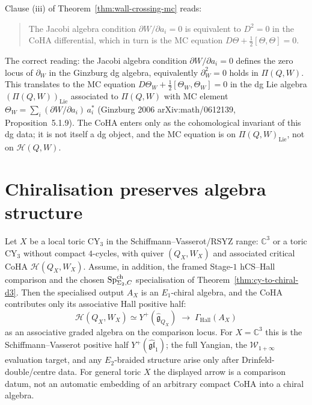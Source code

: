 \begin{remark}
\label{rem:reconciliation-wall-crossing-prose}
Clause (iii) of Theorem~\ref{thm:wall-crossing-mc} reads:
\begin{quote}
 The Jacobi algebra condition $\partial W / \partial a_i = 0$ is
 equivalent to $D^2 = 0$ in the CoHA differential, which in turn is
 the MC equation $D\Theta + \frac{1}{2}[\Theta, \Theta] = 0$.
\end{quote}
The correct reading: the Jacobi algebra condition
$\partial W / \partial a_i = 0$ defines the zero locus of
$\partial_W$ in the Ginzburg dg algebra, equivalently
$\partial_W^2 = 0$ holds in $\Pi(Q, W)$. This translates to the MC
equation
$D\Theta_W + \frac{1}{2}[\Theta_W, \Theta_W] = 0$ in the dg Lie
algebra $(\Pi(Q, W))_{\mathrm{Lie}}$ associated to
$\Pi(Q, W)$ with MC element
$\Theta_W = \sum_i (\partial W / \partial a_i) \, a_i^*$ (Ginzburg
2006 \textup{arXiv:math/0612139}, Proposition~5.1.9). The CoHA enters only as the cohomological
invariant of this dg data; it is not itself a dg object, and the
MC equation is on $\Pi(Q, W)_{\mathrm{Lie}}$, not on
$\mathcal{H}(Q, W)$.
\end{remark}

\section{Chiralisation preserves algebra structure}
\label{sec:chiralisation-preserves-algebra}

\begin{theorem}
\label{thm:coha-chiralization-preserves-algebra}
Let $X$ be a local toric CY$_3$ in the Schiffmann--Vasserot/RSYZ
range: $\mathbb C^3$ or a toric CY$_3$ without compact $4$-cycles,
with quiver $(Q_X,W_X)$ and associated critical CoHA
$\mathcal{H}(Q_X,W_X)$. Assume, in addition, the framed
Stage-$1$ hCS--Hall comparison and the chosen
$\mathrm{Sp}^{\mathrm{ch}}_{\Sigma_2,C}$ specialisation of
Theorem~\textup{\ref{thm:cy-to-chiral-d3}}. Then the specialised
output $A_X$ is an $E_1$-chiral algebra, and the CoHA contributes only
its associative Hall positive half:
\[
 \mathcal{H}(Q_X, W_X)
 \simeq
 Y^+(\widehat{\mathfrak{g}}_{Q_X})
 \;\longrightarrow\;
 \Gamma_{\mathrm{Hall}}(A_X)
\]
as an associative graded algebra on the comparison locus. For
$X=\mathbb C^3$ this is the Schiffmann--Vasserot positive half
$Y^+(\widehat{\mathfrak{gl}}_1)$; the full Yangian, the
$\mathcal W_{1+\infty}$ evaluation target, and any $E_2$-braided
structure arise only after Drinfeld-double/centre data. For general
toric $X$ the displayed arrow is a comparison datum, not an automatic
embedding of an arbitrary compact CoHA into a chiral algebra.
\end{theorem}

